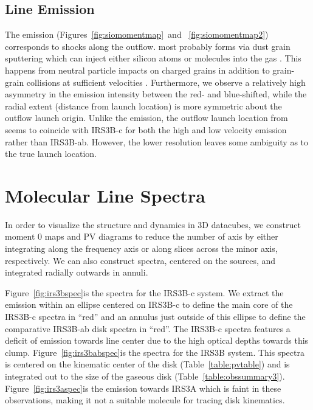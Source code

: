\subsection{\sio\space Line Emission}\label{sec:sioemission}
The \sio\space emission (Figures~\ref{fig:siomomentmap}\space~and~ \ref{fig:siomomentmap2}) corresponds to shocks along the outflow. \sio\space most probably forms via dust grain sputtering which can inject either silicon atoms or \sio\space molecules into the gas \citep[][]{1997AA...322..296C}. This happens from neutral particle impacts on charged grains in addition to grain-grain collisions at sufficient velocities \citep[25-35~km~$s^{-1}$;][]{1997AA...322..296C}. Furthermore, we observe a relatively high asymmetry in the emission intensity between the red- and blue-shifted, while the radial extent (distance from launch location) is more symmetric about the outflow launch origin. Unlike the \co\space emission, the outflow launch location from \sio\space seems to coincide with IRS3B-c for both the high and low velocity emission rather than IRS3B-ab. However, the lower resolution leaves some ambiguity as to the true launch location.

\section{Molecular Line Spectra}\label{sec:spectra}
In order to visualize the structure and dynamics in 3D datacubes,  we construct moment 0 maps and PV diagrams to reduce the number of axis by either integrating along the frequency axis or along slices across the minor axis, respectively. We can also construct spectra, centered on the sources, and integrated radially outwards in annuli.

Figure~\ref{fig:irs3bspec}\space is the \cso\space spectra for the IRS3B-c system. We extract the emission within an ellipse centered on IRS3B-c to define the main core of the IRS3B-c spectra in ``red'' and an annulus just outside of this ellipse to define the comparative IRS3B-ab disk spectra in ``red''. The IRS3B-c spectra features a deficit of emission towards line center due to the high optical depths towards this clump. Figure~\ref{fig:irs3babspec}\space is the \cso\space spectra for the IRS3B system. This spectra is centered on the kinematic center of the disk (Table~\ref{table:pvtable}) and is integrated out to the size of the gaseous disk (Table~\ref{table:obssummary3}). Figure~\ref{fig:irs3aspec}\space is the \cso\space emission towards IRS3A which is faint in these observations, making it not a suitable molecule for tracing disk kinematics.

